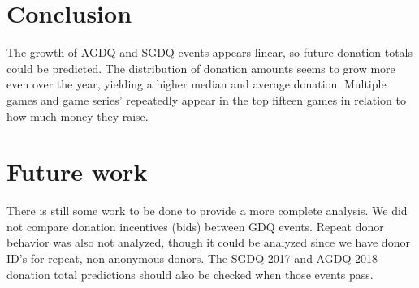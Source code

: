 \documentclass[journal]{IEEEtran}
\begin{document}

\section{Conclusion}

The growth of AGDQ and SGDQ events appears linear, so future donation totals could be predicted. The distribution of donation amounts seems to grow more even over the year, yielding a higher median and average donation. Multiple games and game series' repeatedly appear in the top fifteen games in relation to how much money they raise.


\section{Future work}

There is still some work to be done to provide a more complete analysis. We did not compare donation incentives (bids) between GDQ events. Repeat donor behavior was also not analyzed, though it could be analyzed since we have donor ID's for repeat, non-anonymous donors. The SGDQ 2017 and AGDQ 2018 donation total predictions should also be checked when those events pass.



%
\end{document}
